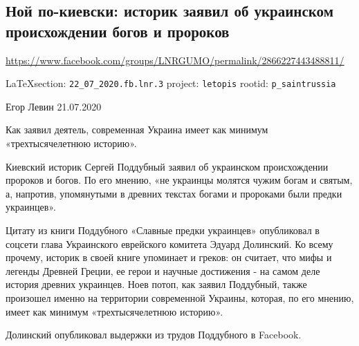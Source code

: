  
 
  
\subsection{Ной по-киевски: историк заявил об украинском происхождении богов и пророков}
\url{https://www.facebook.com/groups/LNRGUMO/permalink/2866227443488811/}

\vspace{0.5cm}
{\small\LaTeX section: \verb|22_07_2020.fb.lnr.3| project: \verb|letopis| rootid: \verb|p_saintrussia|}
\vspace{0.5cm}


Егор Левин
21.07.2020

Как заявил деятель, современная Украина имеет как минимум «трехтысячелетнюю
историю».

Киевский историк Сергей Поддубный заявил об украинском происхождении пророков и
богов. По его мнению, «не украинцы молятся чужим богам и святым, а, напротив,
упомянутыми в древних текстах богами и пророками были предки украинцев».

Цитату из книги Поддубного «Славные предки украинцев» опубликовал в соцсети
глава Украинского еврейского комитета Эдуард Долинский. Ко всему прочему,
историк в своей книге упоминает и греков: он считает, что мифы и легенды
Древней Греции, ее герои и научные достижения - на самом деле история древних
украинцев.  Ноев потоп, как заявил Поддубный, также произошел именно на
территории современной Украины, которая, по его мнению, имеет как минимум
«трехтысячелетнюю историю».

Долинский опубликовал выдержки из трудов Поддубного в Facebook.
